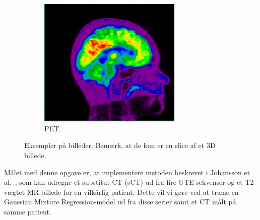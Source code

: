 \begin{figure}
\begin{subfigure}{0.3\textwidth}
        \includegraphics[width=0.75\textwidth]{billeder/pet.png}
        \caption{PET.}
        \label{eksempel:pet}
    \end{subfigure}\hfill
    \caption{Eksempler på billeder. Bemærk, at de kun er en slice af et 3D billede.}
    \label{eksempel}
\end{figure}


Målet med denne opgave er, at implementere metoden beskrevet i
Johansson et al.~\cite{johansson}, som kan udregne et substitut-CT (sCT)
ud fra fire UTE sekvenser og et T2-vægtet MR-billede for en vilkårlig
patient. Dette vil vi gøre ved at træne en Gaussian Mixture Regression-model ud fra disse serier samt et CT målt på samme patient.
